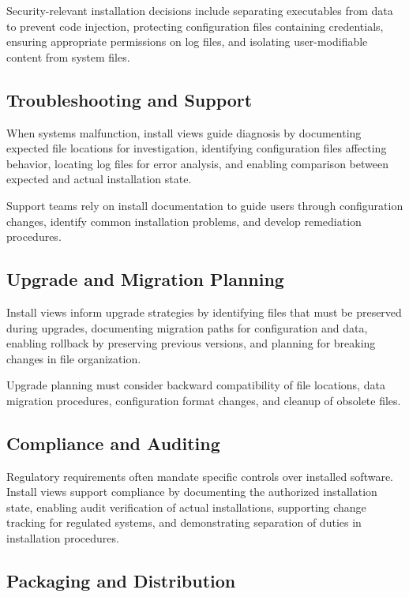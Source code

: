 \documentclass[11pt]{article}
\begin{document}
Security-relevant installation decisions include separating executables from data to prevent code injection, protecting configuration files containing credentials, ensuring appropriate permissions on log files, and isolating user-modifiable content from system files.

\subsection{Troubleshooting and Support}

When systems malfunction, install views guide diagnosis by documenting expected file locations for investigation, identifying configuration files affecting behavior, locating log files for error analysis, and enabling comparison between expected and actual installation state.

Support teams rely on install documentation to guide users through configuration changes, identify common installation problems, and develop remediation procedures.

\subsection{Upgrade and Migration Planning}

Install views inform upgrade strategies by identifying files that must be preserved during upgrades, documenting migration paths for configuration and data, enabling rollback by preserving previous versions, and planning for breaking changes in file organization.

Upgrade planning must consider backward compatibility of file locations, data migration procedures, configuration format changes, and cleanup of obsolete files.

\subsection{Compliance and Auditing}

Regulatory requirements often mandate specific controls over installed software. Install views support compliance by documenting the authorized installation state, enabling audit verification of actual installations, supporting change tracking for regulated systems, and demonstrating separation of duties in installation procedures.

\subsection{Packaging and Distribution}
\end{document}

